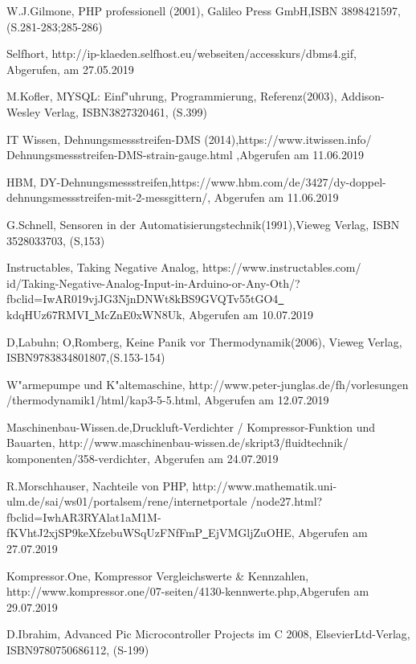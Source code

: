 \begin{thebibliography}{99}
W.J.Gilmone, PHP professionell (2001), Galileo Press GmbH,ISBN 3898421597, (S.281-283;285-286)

Selfhort, http://ip-klaeden.selfhost.eu/webseiten/accesskurs/dbms4.gif, 
Abgerufen, am 27.05.2019

M.Kofler, MYSQL: Einf"uhrung, Programmierung, Referenz(2003), Addison-
Wesley Verlag, ISBN3827320461, (S.399)

IT Wissen, Dehnungsmessstreifen-DMS (2014),https://www.itwissen.info/
Dehnungsmessstreifen-DMS-strain-gauge.html ,Abgerufen am 11.06.2019

HBM, DY-Dehnungsmessstreifen,https://www.hbm.com/de/3427/dy-doppel-
dehnungsmessstreifen-mit-2-messgittern/, Abgerufen am 11.06.2019

G.Schnell, Sensoren in der Automatisierungstechnik(1991),Vieweg Verlag, 
ISBN 3528033703, (S,153)

Instructables, Taking Negative Analog, https://www.instructables.com/
id/Taking-Negative-Analog-Input-in-Arduino-or-Any-Oth/?
fbclid=IwAR019vjJG3NjnDNWt8kBS9GVQTv55tGO4\underline{\ }
kdqHUz67RMVI\underline{\ }McZnE0xWN8Uk, Abgerufen am 10.07.2019

D,Labuhn; O,Romberg, Keine Panik vor Thermodynamik(2006), Vieweg Verlag,
 ISBN9783834801807,(S.153-154)

W"armepumpe und K"altemaschine, http://www.peter-junglas.de/fh/vorlesungen
/thermodynamik1/html/kap3-5-5.html,  Abgerufen am 12.07.2019

Maschinenbau-Wissen.de,Druckluft-Verdichter / Kompressor-Funktion und 
Bauarten, http://www.maschinenbau-wissen.de/skript3/fluidtechnik/
komponenten/358-verdichter, Abgerufen am 24.07.2019



R.Morschhauser, Nachteile von PHP, 
http://www.mathematik.uni-ulm.de/sai/ws01/portalsem/rene/internetportale
/node27.html?fbclid=IwhAR3RYAlat1aM1M-fKVhtJ2xjSP9keXfzebuWSqUzFNfFmP\underline{\ }EjVMGljZuOHE,
 Abgerufen am 27.07.2019
 
 Kompressor.One, Kompressor Vergleichswerte \& Kennzahlen,
 http://www.kompressor.one/07-seiten/4130-kennwerte.php,Abgerufen am 29.07.2019
 
 D.Ibrahim, Advanced Pic Microcontroller Projects im C 2008, ElsevierLtd-Verlag,
 ISBN9780750686112, (S-199)
 














\end{thebibliography} 
